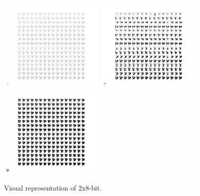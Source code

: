 \documentclass[letterpaper, 12pt]{article}
\begin{document}
\begin{figure}
	\centering
		\includegraphics[width=2in]{binaryRepresentation-01}
		\includegraphics[width=2in]{binaryRepresentation-02}
		\includegraphics[width=2in]{binaryRepresentation-03}
	\caption{Visual representation of 2x8-bit.}
	\label{fig:fig_2013-heapIris-white}
\end{figure}





\vspace*{24pt}
\end{document}

